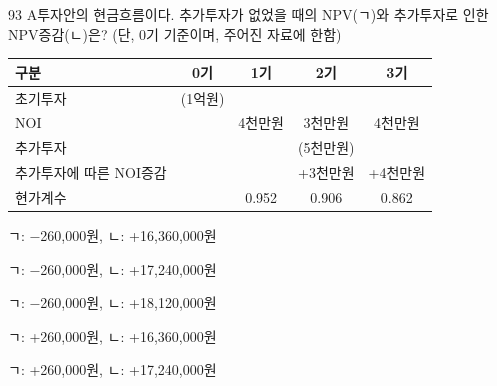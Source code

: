 \begin{question}{93}
A투자안의 현금흐름이다. 추가투자가 없었을 때의 NPV(ㄱ)와 추가투자로 인한 NPV증감(ㄴ)은? (단, 0기 기준이며, 주어진 자료에 한함)
\par{\small\centering\begin{tabular}{|l|c|c|c|c|}\hline
구분 & 0기 & 1기 & 2기 & 3기 \tabularnewline \hline
초기투자 & (1억원) & & & \tabularnewline \hline
NOI & & 4천만원 & 3천만원 & 4천만원 \tabularnewline \hline
추가투자 & & & (5천만원) & \tabularnewline \hline
추가투자에 따른 NOI증감 & & & +3천만원 & +4천만원 \tabularnewline \hline
현가계수 & & 0.952 & 0.906 & 0.862 \tabularnewline \hline
\end{tabular}\par}
\begin{choices}
  \item ㄱ: $-$260,000원, ㄴ: +16,360,000원
  \item ㄱ: $-$260,000원, ㄴ: +17,240,000원
  \item ㄱ: $-$260,000원, ㄴ: +18,120,000원
  \item ㄱ: +260,000원, ㄴ: +16,360,000원
  \item ㄱ: +260,000원, ㄴ: +17,240,000원
\end{choices}
\end{question}
